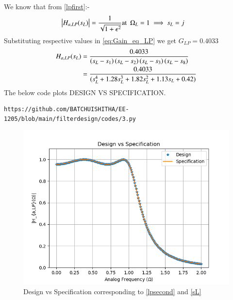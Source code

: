 \documentclass{article}
\begin{document}
\begin{enumerate}
We know that from \eqref{lpfirst}:-
\begin{align}
    \left\vert H_{a,LP}(s_L)\right\vert &= \frac{1}{\sqrt{1+\epsilon^2}} \text{at} \hspace{5pt} \Omega_{L}=1 \implies s_{L} = j \label{eq:Gain_eq_LP} 
\end{align}
Substituting respective values in \eqref{eq:Gain_eq_LP} we get $G_{LP}=0.4033$
\begin{align}
     H_{a,LP}(s_L) &= \frac{0.4033}{\left(s_L-s_1\right)\left(s_L-s_2\right)\left(s_L-s_3\right)\left(s_L-s_8\right)}\\
     &=\frac{0.4033}{(s_L^4 + 1.28s_L^3 + 1.82s_L^2 + 1.13s_L + 0.42)} \label{sL}
\end{align}
The below code plots DESIGN VS SPECIFICATION.
\begin{lstlisting}
https://github.com/BATCHUISHITHA/EE-1205/blob/main/filterdesign/codes/3.py
\end{lstlisting}
\begin{figure}[H]
\centering
\includegraphics[width=1\columnwidth]{figs/3.png}
\caption{Design vs Specification corresponding to \eqref{lpsecond} and \eqref{sL}}
\label{fig:designvsspecification_plt}
\end{figure}


\end{enumerate}
\end{document}
